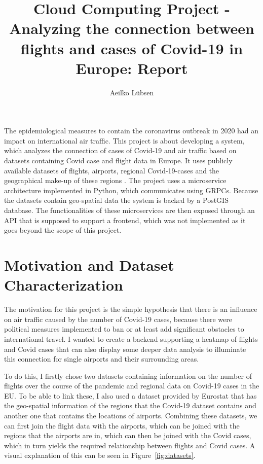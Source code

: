 \documentclass[11pt]{article}
\title{Cloud Computing Project - Analyzing the connection between flights and cases of Covid-19 in Europe: Report}
\author{Aeilko Lübsen}
\begin{document}
	
	\maketitle
	
	The epidemiological measures to contain the coronavirus outbreak in 2020 had an impact on international air traffic. This project is about developing a system, which analyzes the connection of cases of Covid-19 and air traffic based on datasets containing Covid case and flight data in Europe. It uses publicly available datasets of flights, airports, regional Covid-19-cases and the geographical make-up of these regions \cite{airtraffic2021, covid2022, nuts2016, airports2022}. The project uses a microservice architecture implemented in Python, which communicates using GRPCs. Because the datasets contain geo-spatial data the system is backed by a PostGIS database. The functionalities of these microservices are then exposed through an API that is supposed to support a frontend, which was not implemented as it goes beyond the scope of this project.
	
	\section{Motivation and Dataset Characterization}
	
	The motivation for this project is the simple hypothesis that there is an influence on air traffic caused by the number of Covid-19 cases, because there were political measures implemented to ban or at least add significant obstacles to international travel. I wanted to create a backend supporting a heatmap of flights and Covid cases that can also display some deeper data analysis to illuminate this connection for single airports and their surrounding areas.
	
	To do this, I firstly chose two datasets containing information on the number of flights over the course of the pandemic and regional data on Covid-19 cases in the EU. To be able to link these, I also used a dataset provided by Eurostat that has the geo-spatial information of the regions that the Covid-19 dataset contains and another one that contains the locations of airports. Combining these datasets, we can first join the flight data with the airports, which can be joined with the regions that the airports are in, which can then be joined with the Covid cases, which in turn yields the required relationship between flights and Covid cases. A visual explanation of this can be seen in Figure~\ref{fig:datasets}.
	
\end{document}
